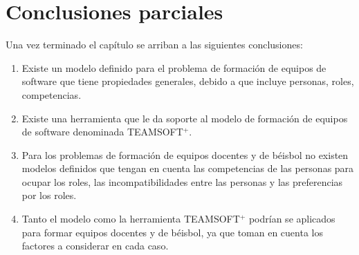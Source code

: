 \section{Conclusiones parciales}
Una vez terminado el capítulo se arriban a las siguientes conclusiones:
\begin{enumerate}
	\setlength\itemsep{0em}
	\item Existe un modelo definido para el problema de formación de equipos de software que tiene propiedades generales, debido a que incluye personas, roles, competencias.
	\item Existe una herramienta que le da soporte al modelo de formación de equipos de software denominada TEAMSOFT$^+$.
	\item Para los problemas de formación de equipos docentes y de béisbol no existen modelos definidos que tengan en cuenta las competencias de las personas para ocupar los roles, las incompatibilidades entre las personas y las preferencias por los roles.
	\item Tanto el modelo como la herramienta TEAMSOFT$^+$ podrían se aplicados para formar equipos docentes y de béisbol, ya que toman en cuenta los factores a considerar en cada caso.
\end{enumerate}
\pagebreak
%
